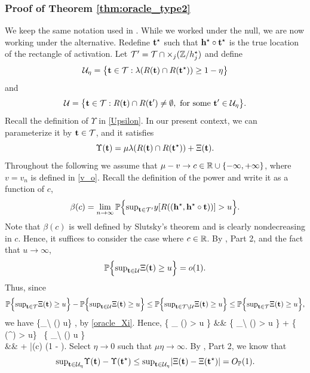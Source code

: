 \documentclass[twoside,11pt]{article}
\begin{document}
\subsubsection{Proof of Theorem \ref{thm:oracle_type2}}
\label{sec:proof_oracle_type2}
We keep the same notation used in .
While we worked under the null, we are now working under the alternative.
Redefine $\mathbf{t}^\star$ such that $\mathbf{h}^\star \circ \mathbf{t}^\star$ is the true location of the rectangle of activation.
Let ${\mathcal{T}}' = {\mathcal{T}} \cap \times_j (\mathbb{Z}/h_j^{\star})$ and define 
\[
\mathcal{U}_\eta = \big\{\mathbf{t} \in {\mathcal{T}} : \lambda(R(\mathbf{t}) \cap R(\mathbf{t}^\star)) \ge 1 - \eta \big\}\]
and
\[
\mathcal{U} = \big\{\mathbf{t} \in {\mathcal{T}}: R(\mathbf{t}) \cap R(\mathbf{t}') \neq \emptyset, \textrm{ for some } \mathbf{t}' \in \mathcal{U}_\eta \big\}.
\]
Recall the definition of $\Upsilon$ in \eqref{Upsilon}.  In our present context, we can parameterize it by $\mathbf{t} \in {\mathcal{T}}$, and it satisfies
\[
\Upsilon(\mathbf{t}) = \mu \lambda(R(\mathbf{t}) \cap R(\mathbf{t}^\star)) + \Xi(\mathbf{t}).
\]
Throughout the following we assume that $\mu - v \to c \in \mathbb{R} \cup \{- \infty, +\infty\}$, where $v = v_n$ is defined in \eqref{v_o}.  Recall the definition of the power and write it as a function of $c$,
\[
\beta(c) = \lim_{n \rightarrow \infty} \mathbb{P} \Big\{ {\textstyle\sup}_{\mathbf{t} \in {\mathcal{T}}'} y[R((\mathbf{h}^\star, \mathbf{h}^\star \circ \mathbf{t}))] > u \Big\}.
\]
Note that $\beta(c)$ is well defined by Slutsky's theorem and is clearly nondecreasing in $c$.
Hence, it suffices to consider the case where $c \in \mathbb{R}$.
By , Part 2, and the fact that $u \to \infty$,
\[
\mathbb{P}\Big\{{\textstyle\sup}_{\mathbf{t} \in \mathcal{U}} \Xi(\mathbf{t}) \ge u\Big\} = o(1).
\]
Thus, since
\[
\mathbb{P}\Big\{{\textstyle\sup}_{\mathbf{t} \in {\mathcal{T}}} \Xi(\mathbf{t}) \ge u\Big\} - \mathbb{P}\Big\{{\textstyle\sup}_{\mathbf{t} \in \mathcal{U}} \Xi(\mathbf{t}) \ge u\Big\} \le \mathbb{P}\Big\{{\textstyle\sup}_{\mathbf{t} \in {\mathcal{T}} \backslash \mathcal{U}} \Xi(\mathbf{t}) \ge u\Big\} \le \mathbb{P}\Big\{{\textstyle\sup}_{\mathbf{t} \in {\mathcal{T}}} \Xi(\mathbf{t}) \ge u\Big\},
\]
we have
\beq \label{T-U}
\PP\Big\{\tsup_{\tb \in \Tcal \backslash \Ucal} \Xi(\tb) \ge u\Big\} \to \alpha,
\eeq
by \eqref{oracle_Xi}.
Hence,
\beqn
\PP \Big\{ \tsup_{\tb \in \Tcal} \Upsilon(\tb) > u \Big\} 
&\ge& \PP \Big\{ \tsup_{\tb \in \Tcal \backslash \Ucal} \Upsilon(\tb) > u \Big\} + \PP \{ \Upsilon(\tb^\star) > u\} \, \PP \Big\{ \tsup_{\tb \in \Tcal \backslash \Ucal} \Upsilon(\tb) \le u \Big\} \\
&\to& \alpha + \bar \Phi(c) (1 - \alpha). 
\eeqn
Select $\eta\rightarrow 0$ such that $\mu \eta \rightarrow \infty$.
By , Part 2, we know that
\[
{\textstyle\sup}_{\mathbf{t} \in \mathcal{U}_\eta} \Upsilon(\mathbf{t}) - \Upsilon(\mathbf{t}^\star) \le {\textstyle\sup}_{\mathbf{t} \in \mathcal{U}_\eta} |\Xi(\mathbf{t}) - \Xi(\mathbf{t}^\star)| = O_{\mathbb{P}}(1).
\]
\end{document}
